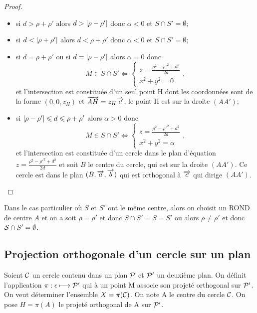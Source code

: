 \begin{proof}
\begin{itemize}
  \item si $d>\rho+\rho'$ alors $d>\abs{\rho-\rho'}$ donc $\alpha<0$ et $S\cap S'=\emptyset$;
  \item si $d<\abs{\rho+\rho'}$ alors $d<\rho+\rho'$ donc $\alpha<0$ et $S\cap S'=\emptyset$;
  \item si $d=\rho+\rho'$ ou si $d=\abs{\rho-\rho'}$ alors $\alpha=0$ donc
    \begin{equation}
      M\in S\cap S' \iff \begin{cases} z=\frac{\rho^2-\rho'^2+d^2}{2d} \\x^2+y^2=0\end{cases},
    \end{equation}
    et l'intersection est constituée d'un seul point H dont les coordonnées sont de la forme $(0,0,z_H)$ et $\vect{AH}=z_H \vc$, le point H est sur la droite $(AA')$;
  \item si $\abs{\rho-\rho'}\leqslant d \leqslant \rho+\rho'$ alors $\alpha>0$ donc
    \begin{equation}
      M\in S\cap S' \iff \begin{cases} z=\frac{\rho^2-\rho'^2+d^2}{2d} \\x^2+y^2=\alpha\end{cases},
    \end{equation}
    et l'intersection est constituée d'un cercle dans le plan d'équation $z=\frac{\rho^2-\rho'^2+d^2}{2d}$ et soit $B$ le centre du cercle, qui est sur la droite $(AA')$. Ce cercle est dans le plan $(B,\va,\vb)$ qui est orthogonal à $\vc$ qui dirige $(AA')$.
  \end{itemize}
\end{proof}
Dans le cas particulier où $S$ et $S'$ ont le même centre, alors on choisit un ROND de centre $A$ et on a soit $\rho=\rho'$ et donc $S\cap S'=S=S'$ ou alors $\rho\neq \rho'$ et donc $\S\cap S' =\emptyset$.

\subsection{Projection orthogonale d'un cercle sur un plan}

Soient $\courbe$ un cercle contenu dans un plan $\P$ et $\P'$ un deuxième plan. On définit l'application $\pi:\epsilon \longmapsto \P'$ qui à un point M associe son projeté orthogonal sur $\P'$. On veut déterminer l'ensemble $X=\pi(\courbe)$. On note A le centre du cercle $\courbe$. On pose $H=\pi(A)$ le projeté orthogonal de A sur $\P'$. 

